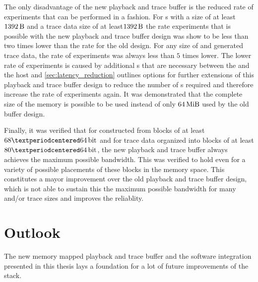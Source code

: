 The only disadvantage of the new playback and trace buffer is the reduced rate of experiments that can be performed in a \HWinTheLoop{} fashion.
For \PlaybackProgram{}s with a size of at least $\SI{1392}{\byte}$ and a trace data size of at least$\SI{1392}{\byte}$ the rate experiments that is possible with the new playback and trace buffer design was show to be less than two times lower than the rate for the old design. For any size of \PlaybackProgram{} and generated trace data, the rate of experiments was always less than $5$ times lower. The lower rate of experiments is caused by
additional \rtt{}s that are necessary between the \FPGA{} and the host and \autoref{sec:latency_reduction} outlines options for further extensions of this playback and trace buffer design to reduce the number of \rtt{}s required and therefore increase the rate of experiments again.
It was demonstrated that the complete size of the \DDR{} memory is possible to be used instead of only $\SI{64}{\mebi\byte}$ used by the old buffer design.

Finally, it was verified that for \PlaybackProgram{} constructed from blocks of at least $\num{68}·\PhyWordSize{}$ and for trace data organized into blocks of at least $\num{80}·\PhyWordSize{}$, the new playback and trace buffer always achieves the maximum possible bandwidth. This was verified to hold even for a variety of possible placements of these blocks in the \DDR{} memory space.
This constitutes a mayor improvement over the old playback and trace buffer design, which is not able to sustain this the maximum possible bandwidth for many \PlaybackProgram{} and/or trace sizes and improves the reliablity.

\section{Outlook}\label{sec:outlook}
The new memory mapped playback and trace buffer and the software integration presented in this thesis lays a foundation for a lot of future improvements of the \BSS{} stack.
